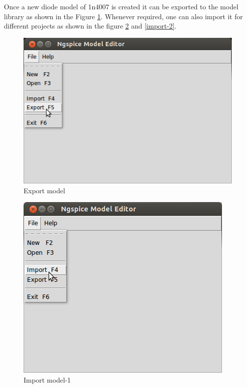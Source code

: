 Once a new diode model of 1n4007 is created it can be exported to the model library as shown in the Figure \ref{export}. Whenever required, one can also import it for different projects as shown in the figure \ref{import-1} and \ref{import-2}.

\begin{figure}[t]%
\begin{center}
\includegraphics[width=0.6\linewidth]{figures/model-build-export.png}%
\caption{Export model}
\label{export}
\end{center}
\end{figure}

\begin{figure}[t]%
\begin{center}
\includegraphics[width=0.5\linewidth]{figures/import-0.png}%
\caption{Import model-1}
\label{import-1}
\end{center}
\end{figure}

